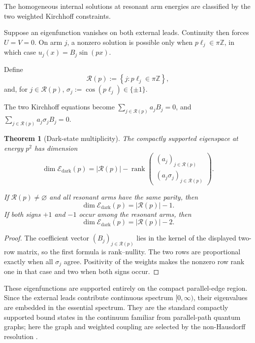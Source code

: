 \documentclass[11pt]{article}
\theoremstyle{plain}
\newtheorem{theorem}{Theorem}[section]
\theoremstyle{definition}
\begin{document}
The homogeneous internal solutions at resonant arm energies are classified
by the two weighted Kirchhoff constraints.

Suppose an eigenfunction vanishes on both external leads. Continuity then
forces
\(U=V=0\).
On arm \(j\), a nonzero solution is possible only when
\(p\ell_j\in\pi\mathbb Z\),
in which case
\(u_j(x)=B_j\sin(px)\).

Define
\[
  \mathcal R(p)
  :=
  \left\{
    j:
    p\ell_j\in\pi\mathbb Z
  \right\},
\]
and, for \(j\in\mathcal R(p)\),
\(\sigma_j := \cos(p\ell_j) \in\{\pm1\}\).

The two Kirchhoff equations become
\(\sum_{j\in\mathcal R(p)} a_jB_j=0\),
and
\(\sum_{j\in\mathcal R(p)} a_j\sigma_jB_j=0\).

\begin{theorem}[Dark-state multiplicity]
\label{thm:split-rejoin-dark-state-multiplicity}
The compactly supported eigenspace at energy \(p^2\) has dimension
\[
  \dim\mathcal E_{\mathrm{dark}}(p)
  =
  |\mathcal R(p)|
  -
  \operatorname{rank}
  \begin{pmatrix}
    (a_j)_{j\in\mathcal R(p)}\\
    (a_j\sigma_j)_{j\in\mathcal R(p)}
  \end{pmatrix}.
\]

If \(\mathcal R(p)\neq\varnothing\) and all resonant arms have the same
parity, then
\[
  \dim\mathcal E_{\mathrm{dark}}(p)
  =
  |\mathcal R(p)|-1.
\]
If both signs \(+1\) and \(-1\) occur among the resonant arms, then
\[
  \dim\mathcal E_{\mathrm{dark}}(p)
  =
  |\mathcal R(p)|-2.
\]
\end{theorem}

\begin{proof}
The coefficient vector \((B_j)_{j\in\mathcal R(p)}\) lies in the kernel of
the displayed two-row matrix, so the first formula is rank--nullity. The two
rows are proportional exactly when all \(\sigma_j\) agree. Positivity of the
weights makes the nonzero row rank one in that case and two when both signs
occur.
\end{proof}

These eigenfunctions are supported entirely on the compact parallel-edge
region. Since the external leads contribute continuous spectrum
\([0,\infty)\),
their eigenvalues are embedded in the essential spectrum. They are the
standard compactly supported bound states in the continuum familiar from
parallel-path quantum graphs; here the graph and weighted coupling are
selected by the non-Hausdorff resolution
\citep{BerkolaikoKuchment2013,ColinDeVerdiereTruc18}.
\end{document}
